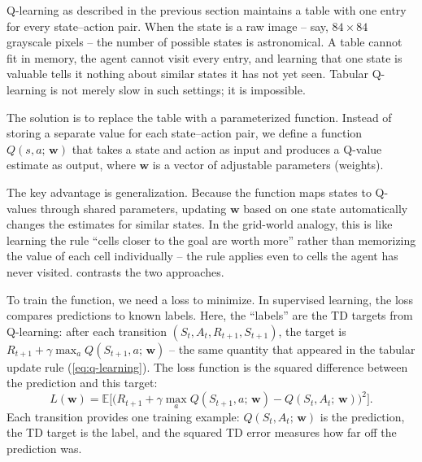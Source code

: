 Q-learning as described in the previous section maintains a table
with one entry for every state--action pair. When the state is a
raw image -- say, $84 \times 84$ grayscale pixels -- the number of
possible states is astronomical. A table cannot fit in memory, the
agent cannot visit every entry, and learning that one state is
valuable tells it nothing about similar states it has not yet seen.
Tabular Q-learning is not merely slow in such settings; it is
impossible.

\smallskip
The solution is to replace the table with a parameterized function.
Instead of storing a separate value for each state--action pair, we
define a function $Q(s, a;\, \mathbf{w})$ that takes a state and
action as input and produces a Q-value estimate as output, where
$\mathbf{w}$ is a vector of adjustable parameters (weights).

\smallskip
The key advantage is generalization. Because the function maps
states to Q-values through shared parameters, updating
$\mathbf{w}$ based on one state automatically changes the estimates
for similar states. In the grid-world analogy, this is like learning
the rule ``cells closer to the goal are worth more'' rather than
memorizing the value of each cell individually -- the rule applies
even to cells the agent has never visited.
 contrasts the two approaches.



\smallskip
To train the function, we need a loss to minimize. In supervised
learning, the loss compares predictions to known labels. Here, the
``labels'' are the TD targets from Q-learning: after each transition
$(S_t, A_t, R_{t+1}, S_{t+1})$, the target is
$R_{t+1} + \gamma \max_a Q(S_{t+1}, a;\, \mathbf{w})$ -- the same
quantity that appeared in the tabular update rule
(\cref{eq:q-learning}). The loss function is the squared difference
between the prediction and this target:
%
\begin{equation}
\label{eq:fa-loss}
L(\mathbf{w}) = \mathbb{E}\Big[\big(
  R_{t+1} + \gamma \max_{a} Q(S_{t+1}, a;\, \mathbf{w})
  - Q(S_t, A_t;\, \mathbf{w})\big)^2\Big].
\end{equation}
%
Each transition provides one training example:
$Q(S_t, A_t;\, \mathbf{w})$ is the prediction, the TD target is
the label, and the squared TD error measures how far off the
prediction was.

